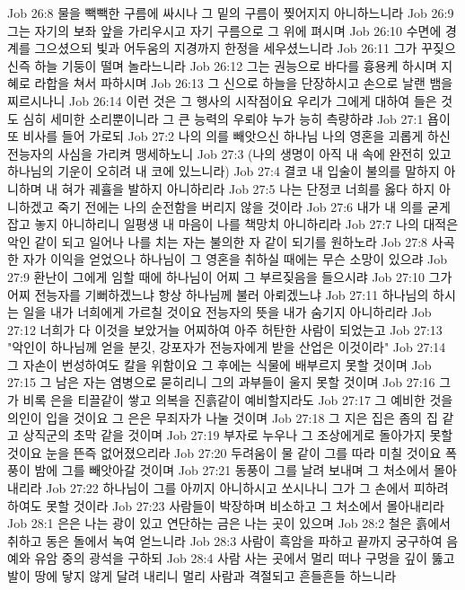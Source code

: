 Job 26:8  물을 빽빽한 구름에 싸시나 그 밑의 구름이 찢어지지 아니하느니라
Job 26:9  그는 자기의 보좌 앞을 가리우시고 자기 구름으로 그 위에 펴시며
Job 26:10  수면에 경계를 그으셨으되 빛과 어두움의 지경까지 한정을 세우셨느니라
Job 26:11  그가 꾸짖으신즉 하늘 기둥이 떨며 놀라느니라
Job 26:12  그는 권능으로 바다를 흉용케 하시며 지혜로 라합을 쳐서 파하시며
Job 26:13  그 신으로 하늘을 단장하시고 손으로 날랜 뱀을 찌르시나니
Job 26:14  이런 것은 그 행사의 시작점이요 우리가 그에게 대하여 들은 것도 심히 세미한 소리뿐이니라 그 큰 능력의 우뢰야 누가 능히 측량하랴
Job 27:1  욥이 또 비사를 들어 가로되
Job 27:2  나의 의를 빼앗으신 하나님 나의 영혼을 괴롭게 하신 전능자의 사심을 가리켜 맹세하노니
Job 27:3  (나의 생명이 아직 내 속에 완전히 있고 하나님의 기운이 오히려 내 코에 있느니라)
Job 27:4  결코 내 입술이 불의를 말하지 아니하며 내 혀가 궤휼을 발하지 아니하리라
Job 27:5  나는 단정코 너희를 옳다 하지 아니하겠고 죽기 전에는 나의 순전함을 버리지 않을 것이라
Job 27:6  내가 내 의를 굳게 잡고 놓지 아니하리니 일평생 내 마음이 나를 책망치 아니하리라
Job 27:7  나의 대적은 악인 같이 되고 일어나 나를 치는 자는 불의한 자 같이 되기를 원하노라
Job 27:8  사곡한 자가 이익을 얻었으나 하나님이 그 영혼을 취하실 때에는 무슨 소망이 있으랴
Job 27:9  환난이 그에게 임할 때에 하나님이 어찌 그 부르짖음을 들으시랴
Job 27:10  그가 어찌 전능자를 기뻐하겠느냐 항상 하나님께 불러 아뢰겠느냐
Job 27:11  하나님의 하시는 일을 내가 너희에게 가르칠 것이요 전능자의 뜻을 내가 숨기지 아니하리라
Job 27:12  너희가 다 이것을 보았거늘 어찌하여 아주 허탄한 사람이 되었는고
Job 27:13  "악인이 하나님께 얻을 분깃, 강포자가 전능자에게 받을 산업은 이것이라"
Job 27:14  그 자손이 번성하여도 칼을 위함이요 그 후에는 식물에 배부르지 못할 것이며
Job 27:15  그 남은 자는 염병으로 묻히리니 그의 과부들이 울지 못할 것이며
Job 27:16  그가 비록 은을 티끌같이 쌓고 의복을 진흙같이 예비할지라도
Job 27:17  그 예비한 것을 의인이 입을 것이요 그 은은 무죄자가 나눌 것이며
Job 27:18  그 지은 집은 좀의 집 같고 상직군의 초막 같을 것이며
Job 27:19  부자로 누우나 그 조상에게로 돌아가지 못할 것이요 눈을 뜬즉 없어졌으리라
Job 27:20  두려움이 물 같이 그를 따라 미칠 것이요 폭풍이 밤에 그를 빼앗아갈 것이며
Job 27:21  동풍이 그를 날려 보내며 그 처소에서 몰아 내리라
Job 27:22  하나님이 그를 아끼지 아니하시고 쏘시나니 그가 그 손에서 피하려 하여도 못할 것이라
Job 27:23  사람들이 박장하며 비소하고 그 처소에서 몰아내리라
Job 28:1  은은 나는 광이 있고 연단하는 금은 나는 곳이 있으며
Job 28:2  철은 흙에서 취하고 동은 돌에서 녹여 얻느니라
Job 28:3  사람이 흑암을 파하고 끝까지 궁구하여 음예와 유암 중의 광석을 구하되
Job 28:4  사람 사는 곳에서 멀리 떠나 구멍을 깊이 뚫고 발이 땅에 닿지 않게 달려 내리니 멀리 사람과 격절되고 흔들흔들 하느니라

